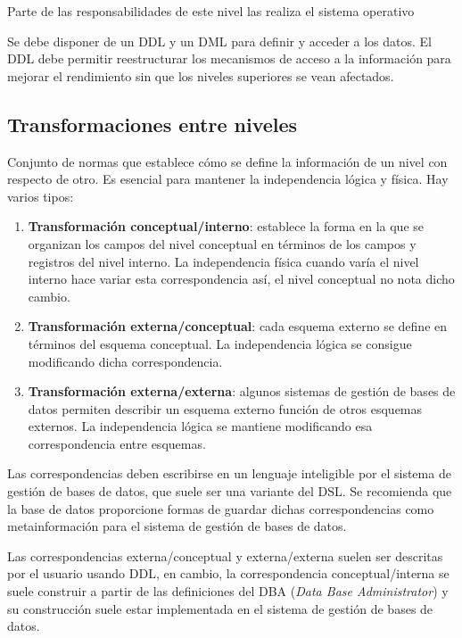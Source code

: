 \documentclass[10pt,a4paper,spanish]{report}
\begin{document}
Parte de las responsabilidades de este nivel las realiza el sistema operativo

Se debe disponer de un DDL y un DML para definir y acceder a los datos. El DDL debe permitir reestructurar los mecanismos de acceso a la información para mejorar el rendimiento sin que los niveles superiores se vean afectados.

\newpage
\textcolor[rgb]{1,0.2,0.3}{\section{Transformaciones entre niveles}}
Conjunto de normas que establece cómo se define la información de un nivel con respecto de otro. Es esencial para mantener la independencia lógica y física. Hay varios tipos:

\begin{enumerate}[$\heartsuit$]
    \item \textcolor[rgb]{1,0.2,0.3}{\textbf{Transformación conceptual/interno}}: establece la forma en la que se organizan los campos del nivel conceptual en términos de los campos y registros del nivel interno. La independencia física cuando varía el nivel interno hace variar esta correspondencia así, el nivel conceptual no nota dicho cambio.
    \item \textcolor[rgb]{1,0.2,0.3}{\textbf{Transformación externa/conceptual}}: cada esquema externo se define en términos del esquema conceptual. La independencia lógica se consigue modificando dicha correspondencia.
    \item \textcolor[rgb]{1,0.2,0.3}{\textbf{Transformación externa/externa}}: algunos sistemas de gestión de bases de datos permiten describir un esquema externo función de otros esquemas externos. La independencia lógica se mantiene modificando esa correspondencia entre esquemas.
\end{enumerate}

Las correspondencias deben escribirse en un lenguaje inteligible por el sistema de gestión de bases de datos, que suele ser una variante del DSL.  Se recomienda que la base de datos proporcione formas de guardar dichas correspondencias como metainformación para el sistema de gestión de bases de datos.

Las correspondencias externa/conceptual y externa/externa suelen ser descritas por el usuario usando DDL, en cambio, la correspondencia conceptual/interna se suele construir a partir de las definiciones del DBA (\textit{\textcolor[rgb]{1,0.2,0.3}{Data Base Administrator}}) y su construcción suele estar implementada en el sistema de gestión de bases de datos.
\end{document}
